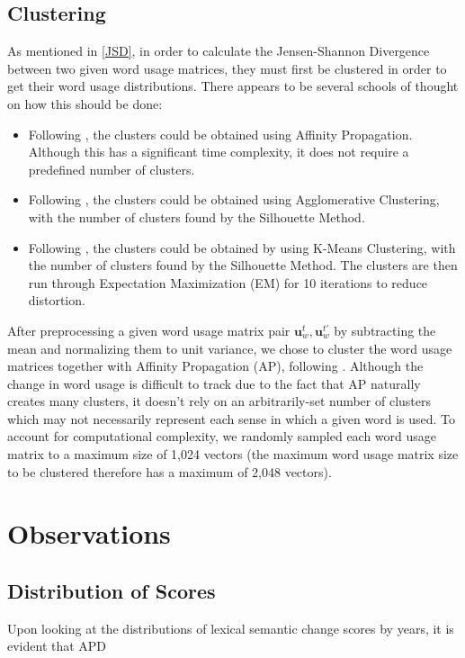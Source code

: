 \documentclass[10pt, a4paper]{article}
\begin{document}
\subsection{Clustering}
\label{clustering}
As mentioned in \ref{JSD}, in order to calculate the Jensen-Shannon Divergence between two given word usage matrices, they must first be clustered in order to get their word usage distributions. There appears to be several schools of thought on how this should be done:
\begin{itemize}
    \item{Following \cite{Martinc2020,Kutuzov2020}, the clusters could be obtained using Affinity Propagation. Although this has a significant time complexity, it does not require a predefined number of clusters.}
    \item{Following \cite{Laicher2021}, the clusters could be obtained using Agglomerative Clustering, with the number of clusters found by the Silhouette Method.}
    \item{Following \cite{Giulianelli2020}, the clusters could be obtained by using K-Means Clustering, with the number of clusters found by the Silhouette Method. The clusters are then run through Expectation Maximization (EM) for 10 iterations to reduce distortion.}
\end{itemize}

After preprocessing a given word usage matrix pair $\textbf{u}^{t}_w, \textbf{u}^{t'}_w$ by subtracting the mean and normalizing them to unit variance, we chose to cluster the word usage matrices together with Affinity Propagation (AP), following \cite{Martinc2020,Kutuzov2020}. Although the change in word usage is difficult to track due to the fact that AP naturally creates many clusters, it doesn't rely on an arbitrarily-set number of clusters which may not necessarily represent each sense in which a given word is used. To account for computational complexity, we randomly sampled each word usage matrix to a maximum size of 1,024 vectors (the maximum word usage matrix size to be clustered therefore has a maximum of 2,048 vectors).

\section{Observations}
\subsection{Distribution of Scores}
Upon looking at the distributions of lexical semantic change scores by years, it is evident that APD 
\end{document}
